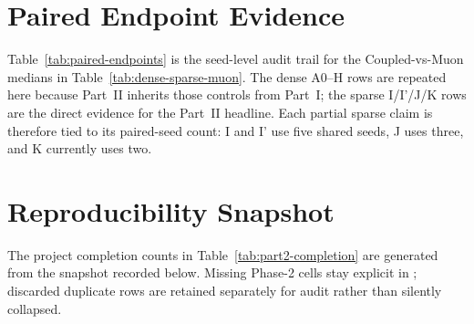 \documentclass[11pt,a4paper]{article}
\begin{document}
\appendix

\section{Paired Endpoint Evidence}

Table~\ref{tab:paired-endpoints} is the seed-level audit trail for the Coupled-vs-Muon medians in Table~\ref{tab:dense-sparse-muon}. The dense A0--H rows are repeated here because Part~II inherits those controls from Part~I; the sparse I/I'/J/K rows are the direct evidence for the Part~II headline. Each partial sparse claim is therefore tied to its paired-seed count: I and I' use five shared seeds, J uses three, and K currently uses two.

\begin{small}
\end{small}

\section{Reproducibility Snapshot}

The project completion counts in Table~\ref{tab:part2-completion} are generated from the snapshot recorded below. Missing Phase-2 cells stay explicit in ; discarded duplicate rows are retained separately for audit rather than silently collapsed.

\begin{table}[h]
\centering
\scriptsize
{}
\caption{Part~II snapshot metadata, CSV pointers, and dedupe rule.}\label{tab:part2-repro-snapshot}
\end{table}

\begin{table}[h]
\centering
\scriptsize
{}
\caption{SHA-256 hashes for the Part~II parquet snapshots used by this report.}\label{tab:part2-repro-hashes}
\end{table}
\end{document}
